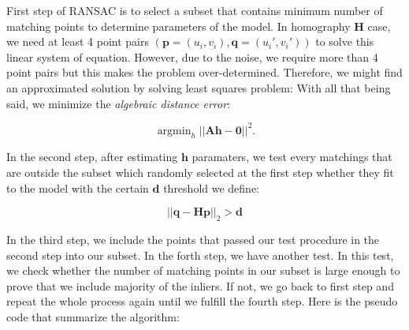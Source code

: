 \documentclass[a4paper]{report}
\numberwithin{figure}{section}
\newcommand{\argmin}{\mathop{\mathrm{argmin}}}
\begin{document}
First step of RANSAC is to select a subset that contains 
minimum number of matching points to 
determine parameters of the model. In homography $\mathbf{H}$ case, we need at least 
4 point pairs $(\mathbf{p}=(u_i,v_i),\mathbf{q}=(u_i',v_i'))$ to solve 
this linear system of equation. However, due to the noise, we require more than 
4 point pairs but this makes the problem over-determined. Therefore, 
we might find an approximated solution by solving least squares problem:
With all that being said, we minimize the 
\textit{algebraic distance error}:

\begin{equation}
\argmin_h || \mathbf{Ah-0}||^2.
\end{equation}

In the second step, 
after estimating $\mathbf{h}$ paramaters, we test every matchings that are 
outside the subset which randomly selected at the first step whether 
they fit to the model with the certain $\mathbf{d}$ threshold we define:

\begin{equation}
  ||\mathbf{q} - \mathbf{H}\mathbf{p}||_2 > \mathbf{d} 
\end{equation}

In the third step, we include the points 
that passed our test procedure in the second step into our subset. In the 
forth step, we have another test. In this test, we check whether the number of 
matching points in our subset is large enough to prove that we include 
majority of the inliers. If not, we go back to first step and repeat the 
whole process again until we fulfill the fourth step. Here is the pseudo code 
that summarize the algorithm:
\end{document}
